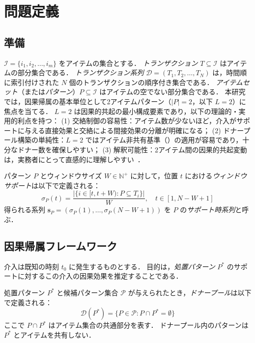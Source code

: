 \section{問題定義}
\label{sec:problem}

\subsection{準備}

$\mathcal{I} = \{i_1, i_2, \ldots, i_m\}$ をアイテムの集合とする．
\emph{トランザクション} $T \subseteq \mathcal{I}$ はアイテムの部分集合である．
\emph{トランザクション系列} $\mathcal{D} = (T_1, T_2, \ldots, T_N)$ は，時間順に索引付けされた $N$ 個のトランザクションの順序付き集合である．
\emph{アイテムセット}（または\emph{パターン}）$P \subseteq \mathcal{I}$ はアイテムの空でない部分集合である．
本研究では，因果帰属の基本単位として2アイテムパターン（$|P|=2$，以下 $L=2$）に焦点を当てる．
$L=2$ は因果的共起の最小構成要素であり，以下の理論的・実用的利点を持つ：
(1) 交絡制御の容易性：アイテム数が少ないほど，介入がサポートに与える直接効果と交絡による間接効果の分離が明確になる；
(2) ドナープール構築の単純性：$L=2$ ではアイテム非共有基準（）の適用が容易であり，十分なドナー数を確保しやすい；
(3) 解釈可能性：2アイテム間の因果的共起変動は，実務者にとって直感的に理解しやすい~\cite{lancaster2018surges}．

\begin{definition}[ウィンドウサポート]
\label{def:windowed-support}
パターン $P$ とウィンドウサイズ $W \in \mathbb{N}^+$ に対して，位置 $t$ における\emph{ウィンドウサポート}は以下で定義される：
\begin{equation}
    \sigma_P(t) = \frac{|\{i \in [t, t+W) : P \subseteq T_i\}|}{W}, \quad t \in [1, N-W+1]
\end{equation}
得られる系列 $\mathbf{s}_P = (\sigma_P(1), \ldots, \sigma_P(N-W+1))$ を $P$ の\emph{サポート時系列}と呼ぶ．
\end{definition}

\subsection{因果帰属フレームワーク}

介入は既知の時刻 $t_0$ に発生するものとする．
目的は，\emph{処置パターン} $P^*$ のサポートに対するこの介入の因果効果を推定することである．

\begin{definition}[ドナープール]
\label{def:donor-pool}
処置パターン $P^*$ と候補パターン集合 $\mathcal{P}$ が与えられたとき，\emph{ドナープール}は以下で定義される：
\begin{equation}
    \mathcal{D}(P^*) = \{P \in \mathcal{P} : P \cap P^* = \emptyset\}
\end{equation}
ここで $P \cap P^*$ はアイテム集合の共通部分を表す．
ドナープール内のパターンは $P^*$ とアイテムを共有しない．
\end{definition}

